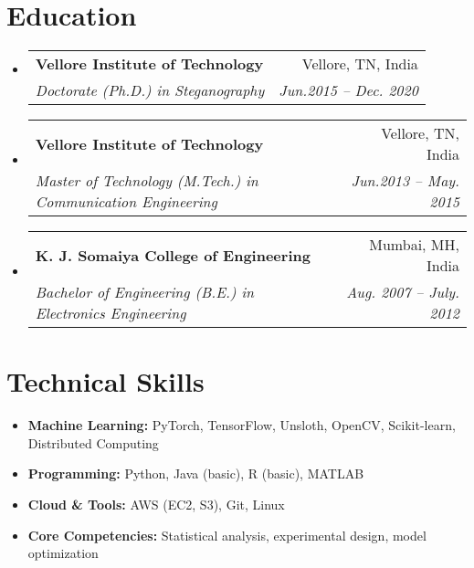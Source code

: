 \documentclass[a4paper,11pt]{article}
\makeatletter
\newcommand{\resumeSubheading}[4]{
  \vspace{-1pt}\item
    \begin{tabular*}{0.97\textwidth}[t]{l@{\extracolsep{\fill}}r}
      \textbf{#1} & #2 \\
      \textit{\small#3} & \textit{\small #4} \\
    \end{tabular*}\vspace{-5pt}
}
\newcommand{\resumeSubHeadingListStart}{\begin{itemize}[leftmargin=*]}
\newcommand{\resumeSubHeadingListEnd}{\end{itemize}}
\makeatother
\begin{document}
\section{Education}
  \resumeSubHeadingListStart
    \resumeSubheading
      {Vellore Institute of Technology}{Vellore, TN, India}
      {Doctorate (Ph.D.) in Steganography}{Jun.2015 -- Dec. 2020}
    \resumeSubheading
      {Vellore Institute of Technology}{Vellore, TN, India}
      {Master of Technology (M.Tech.) in Communication Engineering}{Jun.2013 -- May. 2015}
    \resumeSubheading
      {K. J. Somaiya College of Engineering}{Mumbai, MH, India}
      {Bachelor of Engineering (B.E.) in Electronics Engineering}{Aug. 2007 -- July. 2012}
  \resumeSubHeadingListEnd

\section{Technical Skills}
  \begin{itemize}[leftmargin=*, itemsep = -2pt]
    \item{\textbf{Machine Learning:}{ PyTorch, TensorFlow, Unsloth, OpenCV, Scikit-learn, Distributed Computing}}
    \item{\textbf{Programming:}{ Python, Java (basic), R (basic), MATLAB}}
    \item{\textbf{Cloud \& Tools:}{ AWS (EC2, S3), Git, Linux}}
    \item{\textbf{Core Competencies:}{ Statistical analysis, experimental design, model optimization}}
  \end{itemize}

\end{document}
